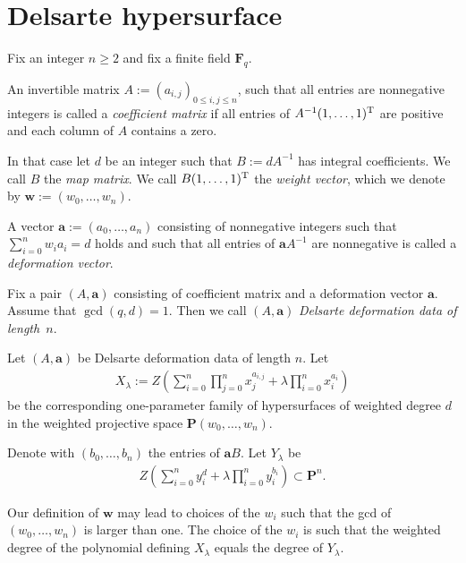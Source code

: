 \section{Delsarte hypersurface}

Fix an integer $n\geq 2$ and f\/ix a f\/inite f\/ield $\mathbf{F}_q$.
\begin{Definition}An invertible matrix $A:=(a_{i,j})_{0\leq i,j\leq n}$, such that all entries are nonnegative integers is called a \emph{coefficient matrix} if all entries of $A^{-1}(1,\dots,1)^{\rm T}$ are positive and each column of $A$ contains a zero.

In that case let $d$ be an integer such that $B:=dA^{-1}$ has integral coef\/f\/icients. We call $B$ the \emph{map matrix}. We call $B(1,\dots,1)^{\rm T}$ the \emph{weight vector}, which we denote by $\mathbf{w}:=(w_0,\dots,w_n)$.

A vector $\mathbf{a}:=(a_0,\dots,a_n)$ consisting of nonnegative integers such that $\sum\limits_{i=0}^n w_ia_i=d$ holds and such that all entries of $\mathbf{a} A^{-1} $ are nonnegative is called a \emph{deformation vector}.
\end{Definition}

\begin{Definition} Fix a pair $(A,\mathbf{a})$ consisting of coef\/f\/icient matrix and a deformation vector $\mathbf{a}$. Assume that $\gcd(q,d)=1$. Then we call $(A,\mathbf{a})$ \emph{Delsarte deformation data of length~$n$}.
\end{Definition}

Let $(A,\mathbf{a})$ be Delsarte deformation data of length $n$. Let
\begin{gather*} X_\lambda:=Z\left( \sum_{i=0}^n \prod_{j=0}^n x_j^{a_{i,j}} + \lambda \prod_{i=0}^n x_i^{a_i}\right)\end{gather*}
be the corresponding one-parameter family of hypersurfaces of weighted degree $d$ in the weighted projective space $\mathbf{P}(w_0,\dots,w_n)$.

Denote with $(b_0,\dots,b_n)$ the entries of $\mathbf{a} B $. Let $Y_{\lambda}$ be
\begin{gather*} Z\left(\sum_{i=0}^n y_i^d +\lambda \prod_{i=0}^n y_i^{b_i}\right) \subset \mathbf{P}^n.\end{gather*}

\begin{Remark} Our def\/inition of $\mathbf{w}$ may lead to choices of the $w_i$ such that the gcd of $(w_0,\dots,w_n)$ is larger than one. The choice of the $w_i$ is such that the weighted degree of the polynomial def\/ining $X_{\lambda}$ equals the degree of $Y_\lambda$.
\end{Remark}

